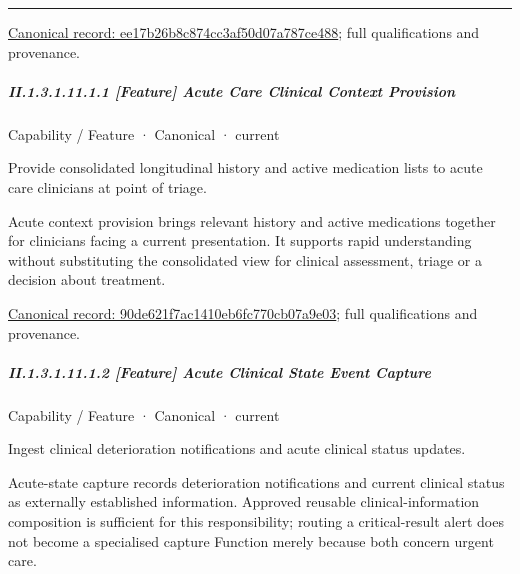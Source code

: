 \medskip\hrule\medskip

{\footnotesize \href{../../../../continuum/strategy/capability/ee17b26b8c874cc3af50d07a787ce488.md}{Canonical record: ee17b26b8c874cc3af50d07a787ce488}; full qualifications and provenance.}\par
\subparagraph*{II.1.3.1.11.1.1 [Feature] Acute Care Clinical Context Provision}
\label{navigation:II.1.3.1.11.1.1}

\label{element:90de621f7ac1410eb6fc770cb07a9e03}
{\small Capability / Feature · Canonical · current}\par

Provide consolidated longitudinal history and active medication lists to acute care clinicians at point of triage.



Acute context provision brings relevant history and active medications together for clinicians facing a current presentation. It supports rapid understanding without substituting the consolidated view for clinical assessment, triage or a decision about treatment.


{\footnotesize \href{../../../../continuum/strategy/capability/feature/90de621f7ac1410eb6fc770cb07a9e03.md}{Canonical record: 90de621f7ac1410eb6fc770cb07a9e03}; full qualifications and provenance.}\par
\subparagraph*{II.1.3.1.11.1.2 [Feature] Acute Clinical State Event Capture}
\label{navigation:II.1.3.1.11.1.2}

\label{element:566f6934c9b04627b0876f91bedd8f30}
{\small Capability / Feature · Canonical · current}\par

Ingest clinical deterioration notifications and acute clinical status updates.



Acute-state capture records deterioration notifications and current clinical status as externally established information. Approved reusable clinical-information composition is sufficient for this responsibility; routing a critical-result alert does not become a specialised capture Function merely because both concern urgent care.



